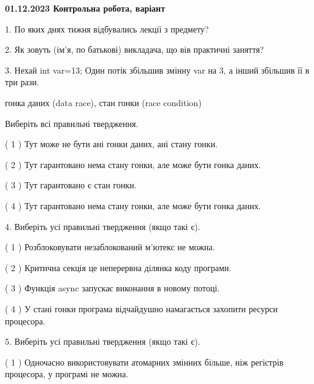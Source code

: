 \documentclass[12pt, ukrainian]{article}
\begin{document}
\vspace{4mm}
\newpage
\begin {large}

\textbf{01.12.2023 Контрольна робота, варіант  }\par


{
1. По яких днях тижня відбувались лекції з предмету?



\vspace{5mm}
2. Як зовуть (ім'я, по батькові) викладача, що вів практичні заняття?



\vspace{5mm}
3. Нехай int var=13; Один потік збільшив змінну var на 3, а інший збільшив її в три рази.

гонка даних (data race), стан гонки (race condition)

Виберіть всі правильні твердження.\par
\vspace{2mm}
( 1 ) Тут може не бути ані гонки даних, ані стану гонки.%

( 2 ) Тут гарантовано нема стану гонки, але може бути гонка даних.%

( 3 ) Тут гарантовано є стан гонки.%

( 4 ) Тут гарантовано нема стану гонки, але може бути гонка даних.%


\vspace{5mm}
4. Виберіть усі правильні твердження (якщо такі є).\par
\vspace{2mm}

( 1 ) Розблоковувати незаблокований м’ютекс не можна.%

( 2 ) Критична секція це неперервна ділянка коду програми.%

( 3 ) Функція async запускає виконання в новому потоці.%

( 4 ) У стані гонки програма відчайдушно намагається захопити ресурси процесора.%


\vspace{5mm}
5. Виберіть усі правильні твердження (якщо такі є).\par
\vspace{2mm}

( 1 ) Одночасно використовувати атомарних змінних більше, ніж регістрів процесора, у програмі не можна.%

}
\end{large}
\end{document}
